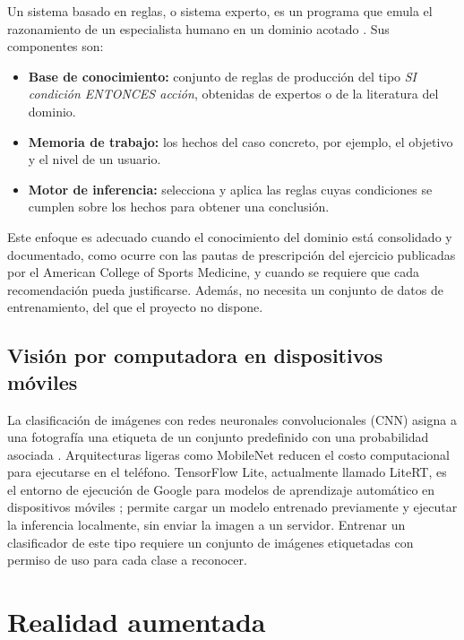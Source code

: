 Un sistema basado en reglas, o sistema experto, es un programa que emula el
razonamiento de un especialista humano en un dominio acotado
\citep{giarratano2005}. Sus componentes son:

\begin{itemize}
    \item \textbf{Base de conocimiento:} conjunto de reglas de producción del
    tipo \emph{SI condición ENTONCES acción}, obtenidas de expertos o de la
    literatura del dominio.
    \item \textbf{Memoria de trabajo:} los hechos del caso concreto, por ejemplo,
    el objetivo y el nivel de un usuario.
    \item \textbf{Motor de inferencia:} selecciona y aplica las reglas cuyas
    condiciones se cumplen sobre los hechos para obtener una conclusión.
\end{itemize}

Este enfoque es adecuado cuando el conocimiento del dominio está
consolidado y documentado, como ocurre con las pautas de prescripción del
ejercicio publicadas por el American College of Sports Medicine, y cuando se
requiere que cada recomendación pueda justificarse. Además, no necesita un
conjunto de datos de entrenamiento, del que el proyecto no dispone.

\subsection{Visión por computadora en dispositivos móviles}

La clasificación de imágenes con redes neuronales convolucionales (CNN) asigna
a una fotografía una etiqueta de un conjunto predefinido con una probabilidad
asociada \citep{goodfellow2016}. Arquitecturas ligeras como MobileNet
\citep{howard2017} reducen el costo computacional para ejecutarse en el
teléfono. TensorFlow Lite, actualmente llamado LiteRT, es el entorno de
ejecución de Google para modelos de aprendizaje automático en dispositivos
móviles \citep{tflite}; permite cargar un modelo entrenado previamente y
ejecutar la inferencia localmente, sin enviar la imagen a un servidor.
Entrenar un clasificador de este tipo requiere un conjunto de imágenes
etiquetadas con permiso de uso para cada clase a reconocer.

\section{Realidad aumentada}
\label{sec:mt-ra}

